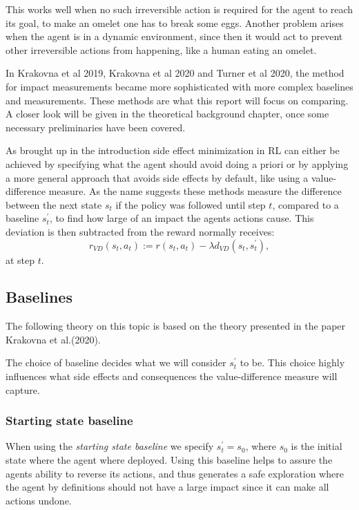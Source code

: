 \documentclass[12pt,A4]{report}
\newcommand{\autobaj}{}
\theoremstyle{definition}
\begin{document}
This works well when no such irreversible action is required for the agent to reach its goal, to make an omelet one has to break some eggs. Another problem arises when the agent is in a dynamic environment, since then it would act to prevent other irreversible actions from happening, like a human eating an omelet. 

In \autobaj{Krakovna et al 2019}, \autobaj{Krakovna et al 2020} and \autobaj{Turner et al 2020}, the method for impact measurements became more sophisticated with more complex baselines and measurements. These methods are what this report will focus on comparing. A closer look will be given in the theoretical background chapter, once some necessary preliminaries have been covered.

As brought up in the introduction side effect minimization in RL can either be achieved by specifying what the agent should avoid doing a priori or by applying a more general approach that avoids side effects by default, like using a value-difference measure. As the name suggests these methods measure the difference between the next state $s_t$ if the policy was followed until step $t$, compared to a baseline $s_t^\prime$, to find how large of an impact the agents actions cause. This deviation is then subtracted from the reward normally receives:
\[ r_{VD}(s_t,a_t) := r(s_t,a_t) - \lambda d_{VD}(s_t, s_t^\prime), \]
at step $t$. 

\subsection{Baselines}
The following theory on this topic is based on the theory presented in the paper \autobaj{Krakovna et al.}(2020).


The choice of baseline decides what we will consider $s^{\prime}_t$ to be. This choice highly influences what side effects and consequences the value-difference measure will capture.

\subsubsection{Starting state baseline}
When using the \textit{starting state baseline} we specify $s^{\prime}_t = s_0$, where $s_0$ is the initial state where the agent where deployed. Using this baseline helps to assure the agents ability to reverse its actions, and thus generates a safe exploration where the agent by definitions should not have a large impact since it can make all actions undone. %
\end{document}
